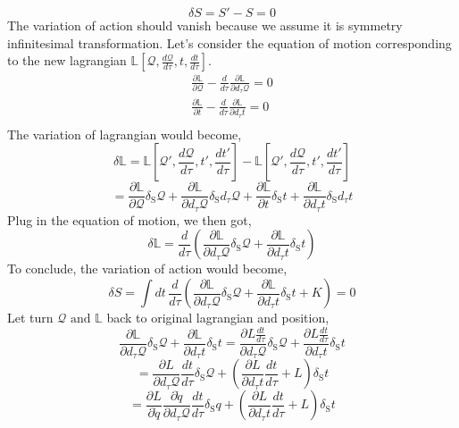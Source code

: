 \documentclass[12pt]{article}
\numberwithin{equation}{section}
\begin{document}
\begin{equation}
    \delta S = S' - S = 0
\end{equation}
The variation of action should vanish because we assume it is symmetry infinitesimal transformation.
Let's consider the equation of motion corresponding to the new lagrangian $\mathbb{L}\left[\mathcal{Q},\frac{d\mathcal{Q}}{d\tau},t, \frac{dt}{d\tau}\right]$.
\begin{equation}
    \begin{split}
        \frac{\partial\mathbb{L}}{\partial\mathcal{Q}}-\frac{d}{d\tau}\frac{\partial\mathbb{L}}{\partial d_{\tau}\mathcal{Q}} = 0\\
        \frac{\partial\mathbb{L}}{\partial t}-\frac{d}{d\tau}\frac{\partial\mathbb{L}}{\partial d_{\tau}t} = 0\\
    \end{split}
\end{equation}
The variation of lagrangian would become,
\begin{equation}
    \delta\mathbb{L} = \mathbb{L}\left[\mathcal{Q}',\frac{d\mathcal{Q}}{d\tau}, t', \frac{dt'}{d\tau}\right] - \mathbb{L}\left[\mathcal{Q}',\frac{d\mathcal{Q}}{d\tau}, t', \frac{dt'}{d\tau}\right]
\end{equation}
\[ = \frac{\partial\mathbb{L}}{\partial\mathcal{Q}}\delta_{\text{S}}\mathcal{Q}+\frac{\partial\mathbb{L}}{\partial d_{\tau}\mathcal{Q}}\delta_{\text{S}}d_{\tau}\mathcal{Q}+\frac{\partial\mathbb{L}}{\partial t}\delta_{\text{S}}t+\frac{\partial\mathbb{L}}{\partial d_{\tau}t}\delta_{\text{S}}d_{\tau}t\]
Plug in the equation of motion, we then got,
\[\delta\mathbb{L} = \frac{d}{d\tau}\left(\frac{\partial\mathbb{L}}{\partial d_{\tau}\mathcal{Q}}\delta_{\text{S}}\mathcal{Q}+\frac{\partial\mathbb{L}}{\partial d_{\tau}t}\delta_{\text{S}}t\right)\]
To conclude, the variation of action would become,
\begin{equation}
    \delta S = \int{dt\,\frac{d}{d\tau}\left(\frac{\partial\mathbb{L}}{\partial d_{\tau}\mathcal{Q}}\delta_{\text{S}}\mathcal{Q}+\frac{\partial\mathbb{L}}{\partial d_{\tau}t}\delta_{\text{S}}t+K\right)} = 0
\end{equation}
Let turn $\mathcal{Q}\text{ and }\mathbb{L}$ back to original lagrangian and position,
\[\frac{\partial\mathbb{L}}{\partial d_{\tau}\mathcal{Q}}\delta_{\text{S}}\mathcal{Q}+\frac{\partial\mathbb{L}}{\partial d_{\tau}t}\delta_{\text{S}}t = \frac{\partial L\frac{dt}{d\tau}}{\partial d_{\tau}\mathcal{Q}}\delta_{\text{S}}\mathcal{Q}+\frac{\partial L\frac{dt}{d\tau}}{\partial d_{\tau}t}\delta_{\text{S}}t\]
\[ = \frac{\partial L}{\partial d_{\tau}\mathcal{Q}}\frac{dt}{d\tau}\delta_{\text{S}}\mathcal{Q}+\left(\frac{\partial L}{\partial d_{\tau}t}\frac{dt}{d\tau}+L\right)\delta_{\text{S}}t\]
\[ = \frac{\partial L}{\partial \dot{q}}\frac{\partial\dot{q}}{\partial d_{\tau}\mathcal{Q}}\frac{dt}{d\tau}\delta_{\text{S}}q+\left(\frac{\partial L}{\partial d_{\tau}t}\frac{dt}{d\tau}+L\right)\delta_{\text{S}}t\]
\end{document}
